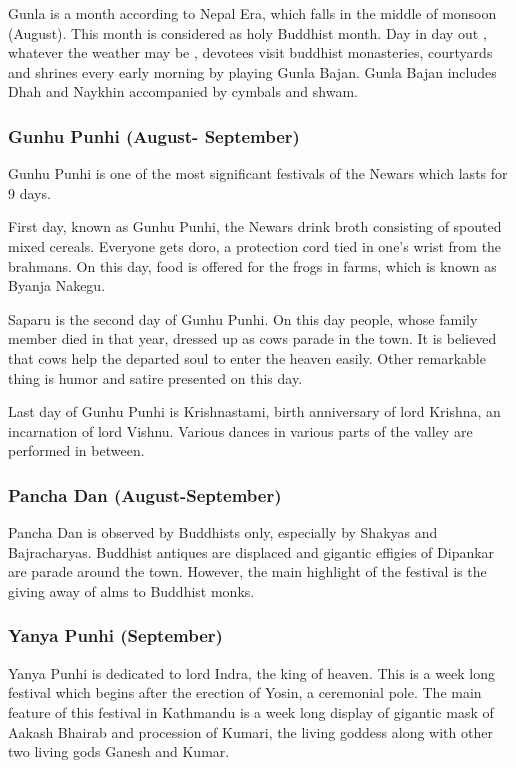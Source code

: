 \documentclass[a4paper,13pt, margin=0.9in]{article}
\begin{document}
\begin{flushleft}
Gunla is a month according to Nepal Era, which falls in the middle of monsoon (August). This month is considered as holy Buddhist month. Day in day out , whatever the weather may be , devotees visit buddhist monasteries, courtyards and shrines every early morning by playing Gunla Bajan. Gunla Bajan includes Dhah and Naykhin accompanied by cymbals and shwam.

\subsubsection{Gunhu Punhi (August- September)}

Gunhu Punhi is one of the most significant festivals of the Newars which lasts for 9 days.

First day, known as Gunhu Punhi, the Newars drink broth consisting of spouted mixed cereals. Everyone gets doro, a protection cord tied in one's wrist from the brahmans. On this day, food is offered for the frogs in farms, which is known as Byanja Nakegu.

Saparu is the second day of Gunhu Punhi. On this day people, whose family member died in that year, dressed up as cows parade in the town. It is believed that cows help the departed soul to enter the heaven easily. Other remarkable thing is humor and satire presented on this day.

Last day of Gunhu Punhi is Krishnastami, birth anniversary of lord Krishna, an incarnation of lord Vishnu. Various dances in various parts of the valley are performed in between.

\subsubsection{Pancha Dan (August-September)}

Pancha Dan is observed by Buddhists only, especially by Shakyas and Bajracharyas. Buddhist antiques are displaced and gigantic effigies of Dipankar are parade around the town. However, the main highlight of the festival is the giving away of alms to Buddhist monks.

\subsubsection{Yanya Punhi (September)}

Yanya Punhi is dedicated to lord Indra, the king of heaven. This is a week long festival which begins after the erection of Yosin, a ceremonial pole. The main feature of this festival in Kathmandu is a week long display of gigantic mask of Aakash Bhairab and procession of Kumari, the living goddess along with other two living gods Ganesh and Kumar.


\end{flushleft}
\end{document}
